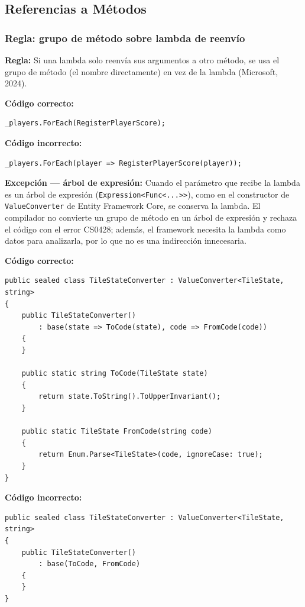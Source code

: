 \subsection{Referencias a Métodos}

\subsubsection{Regla: grupo de método sobre lambda de reenvío}

\textbf{Regla:} Si una lambda solo reenvía sus argumentos a otro método, se usa el grupo de método (el nombre directamente) en vez de la lambda (Microsoft, 2024).

\textbf{Código correcto:}
\begin{lstlisting}[style=csharpstyle]
_players.ForEach(RegisterPlayerScore);
\end{lstlisting}

\textbf{Código incorrecto:}
\begin{lstlisting}[style=csharpstyle]
_players.ForEach(player => RegisterPlayerScore(player));
\end{lstlisting}

\textbf{Excepción --- árbol de expresión:} Cuando el parámetro que recibe la lambda es un árbol de expresión (\texttt{Expression\textless{}Func\textless{}...\textgreater{}\textgreater{}}), como en el constructor de \texttt{ValueConverter} de Entity Framework Core, se conserva la lambda. El compilador no convierte un grupo de método en un árbol de expresión y rechaza el código con el error CS0428; además, el framework necesita la lambda como datos para analizarla, por lo que no es una indirección innecesaria.

\textbf{Código correcto:}
\begin{lstlisting}[style=csharpstyle]
public sealed class TileStateConverter : ValueConverter<TileState, string>
{
    public TileStateConverter()
        : base(state => ToCode(state), code => FromCode(code))
    {
    }

    public static string ToCode(TileState state)
    {
        return state.ToString().ToUpperInvariant();
    }

    public static TileState FromCode(string code)
    {
        return Enum.Parse<TileState>(code, ignoreCase: true);
    }
}
\end{lstlisting}

\textbf{Código incorrecto:}
\begin{lstlisting}[style=csharpstyle]
public sealed class TileStateConverter : ValueConverter<TileState, string>
{
    public TileStateConverter()
        : base(ToCode, FromCode)
    {
    }
}
\end{lstlisting}
